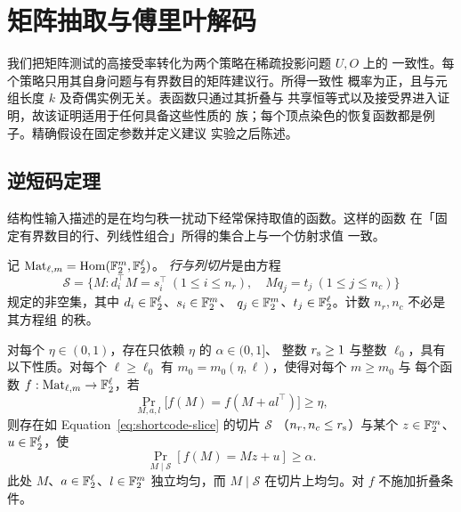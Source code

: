 \section{矩阵抽取与傅里叶解码}
\label{sec:matrix}

我们把矩阵测试的高接受率转化为两个策略在稀疏投影问题 $U,O$ 上的
一致性。每个策略只用其自身问题与有界数目的矩阵建议行。所得一致性
概率为正，且与元组长度 $k$ 及奇偶实例无关。表函数只通过其折叠与
共享恒等式以及接受界进入证明，故该证明适用于任何具备这些性质的
族；每个顶点染色的恢复函数都是例子。精确假设在固定参数并定义建议
实验之后陈述。

\subsection{逆短码定理}

结构性输入描述的是在均匀秩一扰动下经常保持取值的函数。这样的函数
在「固定有界数目的行、列线性组合」所得的集合上与一个仿射求值
一致。

记 $\operatorname{Mat}_{\ell,m}=\operatorname{Hom}(\mathbb F_2^m,\mathbb F_2^\ell)$。
\emph{行与列切片}是由方程
\begin{equation}
 \mathcal S=
 \{M:d_i^\top M=s_i^\top\ (1\le i\le n_r),\quad
          Mq_j=t_j\ (1\le j\le n_c)\}
 \label{eq:shortcode-slice}
\end{equation}
规定的非空集，其中 $d_i\in\mathbb F_2^\ell$、$s_i\in\mathbb F_2^m$、
$q_j\in\mathbb F_2^m$、$t_j\in\mathbb F_2^\ell$。计数 $n_r,n_c$ 不必是其方程组
的秩。

\begin{theorem}[二次短码的相等可靠性]
\label{thm:shortcode}
对每个 $\eta\in(0,1)$，存在只依赖 $\eta$ 的 $\alpha\in(0,1]$、
整数 $r_{\rm s}\ge1$ 与整数 $\ell_0$，具有以下性质。对每个
$\ell\ge\ell_0$ 有 $m_0=m_0(\eta,\ell)$，使得对每个 $m\ge m_0$ 与
每个函数 $f:\operatorname{Mat}_{\ell,m}\to\mathbb F_2^\ell$，若
\begin{equation}
 \Pr_{M,a,l}\bigl[f(M)=f(M+a l^\top)\bigr]\ge\eta,
 \label{eq:shortcode-acceptance}
\end{equation}
则存在如 Equation~\eqref{eq:shortcode-slice} 的切片 $\mathcal S$
（$n_r,n_c\le r_{\rm s}$）与某个 $z\in\mathbb F_2^m$、$u\in\mathbb F_2^\ell$，使
\begin{equation}
 \Pr_{M\mid\mathcal S}[f(M)=Mz+u]\ge\alpha.
 \label{eq:shortcode-conclusion}
\end{equation}
此处 $M$、$a\in\mathbb F_2^\ell$、$l\in\mathbb F_2^m$ 独立均匀，而
$M\mid\mathcal S$ 在切片上均匀。对 $f$ 不施加折叠条件。
\end{theorem}

